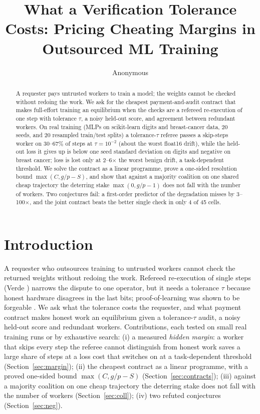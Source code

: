 \documentclass[sigconf,anonymous]{acmart}
\begin{document}
\title{What a Verification Tolerance Costs: Pricing Cheating Margins in Outsourced ML Training}
\author{Anonymous}
\begin{abstract}
A requester pays untrusted workers to train a model; the weights cannot be checked without redoing the work.
We ask for the cheapest payment-and-audit contract that makes full-effort training an equilibrium when the
checks are a refereed re-execution of one step with tolerance $\tau$, a noisy held-out score, and agreement
between redundant workers. On real training (MLPs on scikit-learn digits and breast-cancer data, 20 seeds, and 20 resampled train/test splits) a
tolerance-$\tau$ referee passes a skip-steps worker on 30--67\% of steps at $\tau=10^{-2}$ (about the worst float16 drift),
while the held-out loss it gives up is below one seed standard deviation on digits and negative on breast cancer; loss
is lost only at 2--6$\times$ the worst benign drift, a task-dependent threshold. We solve the contract as a
linear programme, prove a one-sided resolution bound $\max(C,g/p-S)$, and show that against a majority coalition on
one shared cheap trajectory the deterring stake $\max(0,g/p-1)$ does not fall with the number of workers. Two
conjectures fail: a first-order predictor of the degradation misses by 3--100$\times$, and the joint contract beats the
better single check in only 4 of 45 cells.
\end{abstract}
\maketitle

\section{Introduction}
A requester who outsources training to untrusted workers cannot check the returned weights without redoing the work.
Refereed re-execution of single steps (Verde \cite{arun2025verde}) narrows the dispute to one operator, but it needs a
tolerance $\tau$ because honest hardware disagrees in the last bits; proof-of-learning \cite{jia2021pol} was shown to be
forgeable \cite{zhang2021advpol,fang2022pol}. We ask what the tolerance costs the requester, and what payment contract
makes honest work an equilibrium given a tolerance-$\tau$ audit, a noisy held-out score and redundant workers.
Contributions, each tested on small real training runs or by exhaustive search: (i) a measured \emph{hidden margin}: a
worker that skips every step the referee cannot distinguish from honest work saves a large share of steps at a loss
cost that switches on at a task-dependent threshold (Section~\ref{sec:margin}); (ii) the cheapest contract as a linear
programme, with a proved one-sided bound $\max(C,g/p-S)$ (Section~\ref{sec:contracts}); (iii) against a majority
coalition on one cheap trajectory the deterring stake does not fall with the number of workers
(Section~\ref{sec:coll}); (iv) two refuted conjectures (Section~\ref{sec:neg}).
\end{document}
